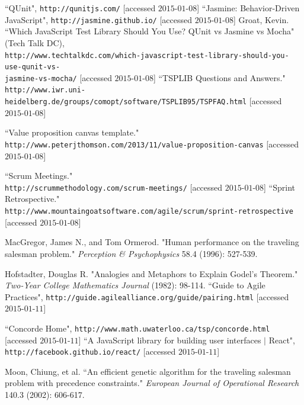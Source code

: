 \documentclass[a4paper, 10pt]{report}
\begin{document}
\begin{appendices}
\begin{thebibliography}{99}
``QUnit", \texttt{http://qunitjs.com/} [accessed $\text{2015-01-08}$]
``Jasmine: Behavior-Driven JavaScript", \texttt{http://jasmine.github.io/} [accessed $\text{2015-01-08}$]
Groat, Kevin. ``Which JavaScript Test Library Should You Use? QUnit vs Jasmine vs Mocha" (Tech Talk DC),\\
\texttt{http://www.techtalkdc.com/which-javascript-test-library-should-you-use-qunit-vs-\\jasmine-vs-mocha/} [accessed $\text{2015-01-08}$]
``TSPLIB Questions and Answers." \\
\texttt{http://www.iwr.uni-heidelberg.de/groups/comopt/software/TSPLIB95/TSPFAQ.html} [accessed $\text{2015-01-08}$]

``Value proposition canvas template."\\ \texttt{http://www.peterjthomson.com/2013/11/value-proposition-canvas} [accessed $\text{2015-01-08}$]

``Scrum Meetings."\\
\texttt{http://scrummethodology.com/scrum-meetings/} [accessed $\text{2015-01-08}$]
``Sprint Retrospective."\\ \texttt{http://www.mountaingoatsoftware.com/agile/scrum/sprint-retrospective} [accessed $\text{2015-01-08}$]

MacGregor, James N., and Tom Ormerod. "Human performance on the traveling salesman problem." \textit{Perception \& Psychophysics} 58.4 (1996): 527-539.

Hofstadter, Douglas R. "Analogies and Metaphors to Explain Godel's Theorem." \textit{Two-Year College Mathematics Journal} (1982): 98-114.
``Guide to Agile Practices", \texttt{http://guide.agilealliance.org/guide/pairing.html} [accessed $\text{2015-01-11}$]

``Concorde Home", \texttt{http://www.math.uwaterloo.ca/tsp/concorde.html}
[accessed $\text{2015-01-11}$]
``A JavaScript library for building user interfaces $|$ React", \texttt{http://facebook.github.io/react/} [accessed $\text{2015-01-11}$]

 Moon, Chiung, et al. ``An efficient genetic algorithm for the traveling salesman problem with precedence constraints." \textit{European Journal of Operational Research} 140.3 (2002): 606-617.



\end{thebibliography}
\end{appendices}
\end{document}
